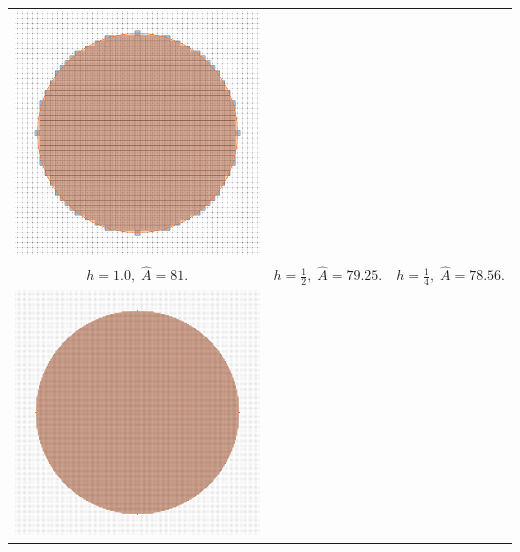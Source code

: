 \begin{frame}
\begin{tabular}{ccc}
\includegraphics[scale=0.4]{figures/motivation/digital-geometric-estimators/multigrid/h025.png} \\
$h=1.0,\; \widehat{A}=81.$ & $h=\frac{1}{2},\; \hat{A}=79.25.$ & $h=\frac{1}{4},\; \hat{A}=78.56.$\\[1em]
\includegraphics[scale=0.4]{figures/motivation/digital-geometric-estimators/multigrid/h00625.png} &

\end{tabular}
\end{frame}
